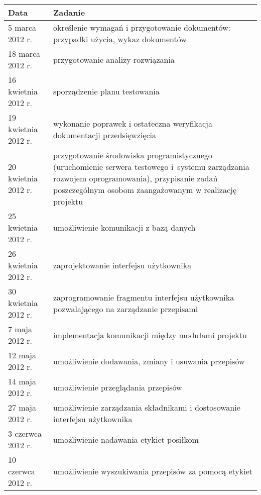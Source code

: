 \documentclass[12pt,leqno, twoside]{mwart}
\begin{document}
\begin{table}
	\centering
		\begin{tabular}{|p{4cm}|p{11cm}|}
		\hline
		\bf{Data}            & \bf{Zadanie} \\ \hline
		5 marca 2012 r. & określenie wymagań i przygotowanie dokumentów: przypadki użycia, wykaz dokumentów \\ \hline
		
		18 marca 2012 r. & przygotowanie analizy rozwiązania \\ \hline
		
		16 kwietnia 2012 r. & sporządzenie planu testowania \\ \hline
		
		19 kwietnia 2012 r. & wykonanie poprawek i ostateczna weryfikacja dokumentacji przedsięwzięcia \\ \hline
		
		20 kwietnia 2012 r. & przygotowanie środowiska programistycznego (uruchomienie serwera testowego i~systemu zarządzania rozwojem oprogramowania), przypisanie zadań poszczególnym osobom zaangażowanym w realizację projektu \\ \hline
		25 kwietnia 2012 r. & umożliwienie komunikacji z bazą danych \\ \hline
		
		26 kwietnia 2012 r. & zaprojektowanie interfejsu użytkownika  \\ \hline
		
		30 kwietnia 2012 r. & zaprogramowanie fragmentu interfejsu użytkownika pozwalającego na zarządzanie przepisami \\ \hline
		
		7 maja 2012 r. & implementacja komunikacji między modułami projektu \\ \hline
		
		12 maja 2012 r. & umożliwienie dodawania, zmiany i usuwania przepisów \\ \hline
		
		14 maja 2012 r. & umożliwienie przeglądania przepisów \\ \hline
		
		27 maja 2012 r. & umożliwienie zarządzania składnikami i dostosowanie interfejsu użytkownika\\ \hline
		
		3 czerwca 2012 r. & umożliwienie nadawania etykiet posiłkom \\ \hline
		
		10 czerwca 2012 r. & umożliwienie wyszukiwania przepisów za pomocą etykiet \\ \hline
		

\end{tabular}
\end{table}
\end{document}
